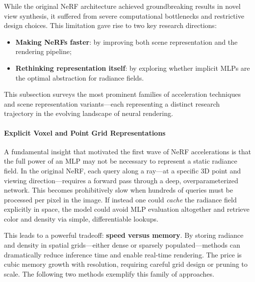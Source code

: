 \newpage
    
\begin{enrichment}
    
    While the original NeRF architecture achieved groundbreaking results in novel view synthesis, it suffered from severe computational bottlenecks and restrictive design choices. This limitation gave rise to two key research directions:
    \begin{itemize}
        \item \textbf{Making NeRFs faster}: by improving both scene representation and the rendering pipeline;
        \item \textbf{Rethinking representation itself}: by exploring whether implicit MLPs are the optimal abstraction for radiance fields.
    \end{itemize}
    This subsection surveys the most prominent families of acceleration techniques and scene representation variants—each representing a distinct research trajectory in the evolving landscape of neural rendering.
    
    \paragraph{Explicit Voxel and Point Grid Representations}
    \label{par:chapter23_nerf_voxel_grids}
    
    A fundamental insight that motivated the first wave of NeRF accelerations is that the full power of an MLP may not be necessary to represent a static radiance field. In the original NeRF, each query along a ray—at a specific 3D point and viewing direction—requires a forward pass through a deep, overparameterized network. This becomes prohibitively slow when hundreds of queries must be processed per pixel in the image. If instead one could \emph{cache} the radiance field explicitly in space, the model could avoid MLP evaluation altogether and retrieve color and density via simple, differentiable lookups.
    
    This leads to a powerful tradeoff: \textbf{speed versus memory}. By storing radiance and density in spatial grids—either dense or sparsely populated—methods can dramatically reduce inference time and enable real-time rendering. The price is cubic memory growth with resolution, requiring careful grid design or pruning to scale. The following two methods exemplify this family of approaches.
    
    \begin{enrichment}
        \label{enr:sybsec_chapter23_plenoxels}
    

\end{enrichment}
\end{enrichment}

